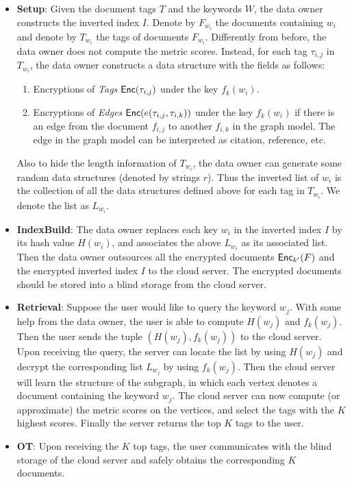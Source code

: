 \documentclass{IEEEtran}
\begin{document}
\begin{itemize}
\item {\bf Setup}: Given the document tags $T$ and the keywords $W$, the data owner constructs the inverted index $I$. Denote by $F_{w_i}$ the documents containing $w_i$ and denote by $T_{w_i}$ the tags of documents $F_{w_i}$. Differently from before, the data owner does not compute the metric scores. Instead, for each tag $\tau_{i,j}$ in $T_{w_i}$, the data owner constructs a data structure with the fields as follows:
	\begin{enumerate}
	\item Encryptions of \emph{Tags} $\textsf{Enc}(\tau_{i,j})$ under the key $f_k(w_i)$.
	\item Encryptions of \emph{Edges} $\textsf{Enc}(e(\tau_{i,j}, \tau_{i,k}))$ under the key $f_k(w_i)$ if there is an edge from the document $f_{i,j}$ to another $f_{i,k}$ in the graph model. The edge in the graph model can be interpreted as citation, reference, etc.
	\end{enumerate}
	Also to hide the length information of $T_{w_i}$, the data owner can generate some random data structures (denoted by strings $r$). 
	Thus the inverted list of $w_i$ is the collection of all the data structures defined above for each tag in $T_{w_i}$. We denote the list as $L_{w_i}$.
\item {\bf IndexBuild}: The data owner replaces each key $w_i$ in the inverted index $I$ by its hash value $H(w_i)$, and associates the above $L_{w_i}$ as its associated list. Then the data owner outsources all the encrypted documents $\textsf{Enc}_{k'}(F)$ and the encrypted inverted index $I$ to the cloud server. The encrypted documents should be stored into a blind storage from the cloud server.
\item {\bf Retrieval}: Suppose the user would like to query the keyword $w_j$. With some help from the data owner, the user is able to compute $H(w_j)$ and $f_k(w_j)$. Then the user sends the tuple $(H(w_j), f_k(w_j))$ to the cloud server. Upon receiving the query, the server can locate the list by using $H(w_j)$ and decrypt the corresponding list $L_{w_j}$ by using $f_k(w_j)$. Then the cloud server will learn the structure of the subgraph, in which each vertex denotes a document containing the keyword $w_j$. The cloud server can now compute (or approximate) the metric scores on the vertices, and select the tags with the $K$ highest scores. Finally the server returns the top $K$ tags to the user.
\item {\bf OT}: Upon receiving the $K$ top tags, the user communicates with the blind storage of the cloud server and safely obtains the corresponding $K$ documents.
\end{itemize}
\end{document}
